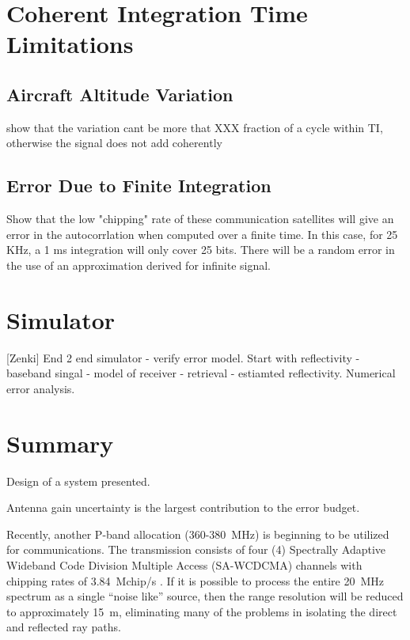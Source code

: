 \documentclass[draftcls,onecolumn]{IEEEtran}  %
\begin{document}
\section{Coherent Integration Time Limitations}

\subsection{Aircraft Altitude Variation}

show that the variation cant be more that XXX fraction of a cycle within TI, otherwise the signal does not add coherently

\subsection{Error Due to Finite Integration}

Show that the low "chipping" rate of these communication satellites will give an error in the autocorrlation when computed over a finite time.
In this case, for 25 KHz, a 1 ms integration will only cover 25 bits.  There will be a random error in the use of an approximation derived for infinite signal. 

\section{Simulator}

[Zenki]
End 2 end simulator - verify error model.  Start with reflectivity - baseband singal - model of receiver - retrieval - estiamted reflectivity.  Numerical error analysis. 

\section{Summary}

Design of a system presented.  

Antenna gain uncertainty is the largest contribution to the error budget. 

Recently, another P-band allocation (360-380~MHz) is beginning to be utilized for communications. 
The transmission consists of four (4) Spectrally Adaptive Wideband Code Division Multiple Access (SA-WCDCMA) channels
with chipping rates of 3.84~Mchip/s \cite{Zunich2009}.
If it is possible to process the entire 20~MHz spectrum as a single ``noise like'' source, then the range resolution will be reduced to approximately 15~m, eliminating many of the problems in isolating the direct and reflected ray paths. 
\end{document}
